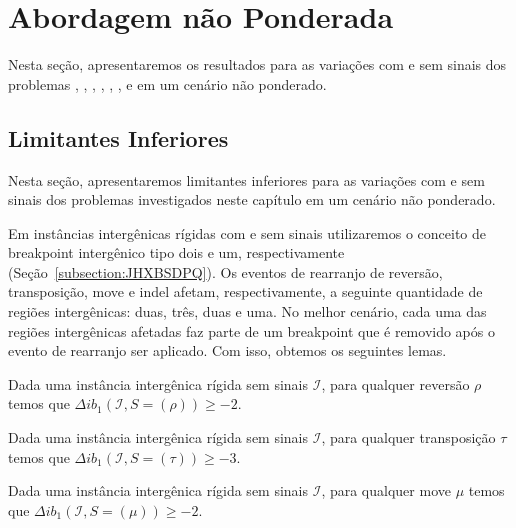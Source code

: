\section{Abordagem não Ponderada}

Nesta seção, apresentaremos os resultados para as variações com e sem sinais dos problemas \SbIR{}, \SbIRI{}, \SbIRM{}, \SbIRMI{}, \SbIRT{}, \SbIRTI{}, \SbIRTM{} e \SbIRTMI{} em um cenário não ponderado.

\subsection{Limitantes Inferiores}

Nesta seção, apresentaremos limitantes inferiores para as variações com e sem sinais dos problemas investigados neste capítulo em um cenário não ponderado.

Em instâncias intergênicas rígidas com e sem sinais utilizaremos o conceito de breakpoint intergênico tipo dois e um, respectivamente (Seção~\ref{subsection:JHXBSDPQ}). Os eventos de rearranjo de reversão, transposição, move e indel afetam, respectivamente, a seguinte quantidade de regiões intergênicas: duas, três, duas e uma. No melhor cenário, cada uma das regiões intergênicas afetadas faz parte de um breakpoint que é removido após o evento de rearranjo ser aplicado. Com isso, obtemos os seguintes lemas.

\begin{lemma}\label{lemma:KFFPUBQG}
Dada uma instância intergênica rígida sem sinais $\mathcal{I}$, para qualquer reversão $\rho$ temos que $\Delta ib_1(\mathcal{I}, S = (\rho)) \ge -2$.
\end{lemma}

\begin{lemma}\label{lemma:IUJZCMMV}
Dada uma instância intergênica rígida sem sinais $\mathcal{I}$, para qualquer transposição $\tau$ temos que $\Delta ib_1(\mathcal{I}, S = (\tau)) \ge -3$.
\end{lemma}

\begin{lemma}\label{lemma:SYXLGTAP}
Dada uma instância intergênica rígida sem sinais $\mathcal{I}$, para qualquer move $\mu$ temos que $\Delta ib_1(\mathcal{I}, S = (\mu)) \ge -2$.
\end{lemma}

